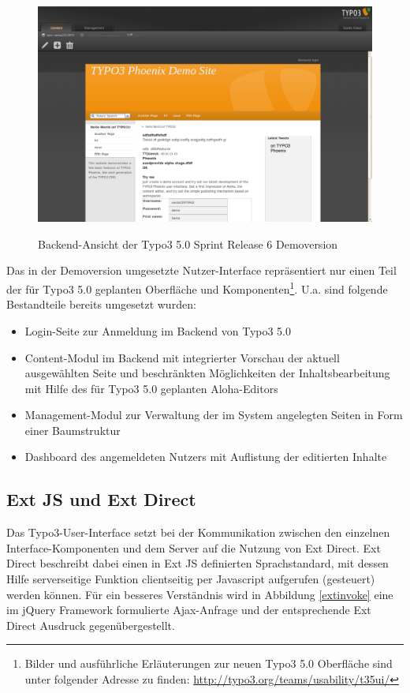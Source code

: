 \begin{figure}[!h]
\begin{center}
\label{fig.typo3backend}
\includegraphics[scale=0.239]{images/typo3/backend.png}
\caption{Backend-Ansicht der Typo3 5.0 Sprint Release 6 Demoversion}
\end{center}
\end{figure}
\newpage
Das in der Demoversion umgesetzte Nutzer-Interface repräsentiert nur einen Teil der für Typo3 5.0 geplanten Oberfläche und Komponenten\footnote{Bilder und ausführliche Erläuterungen zur neuen Typo3 5.0 Oberfläche sind unter folgender Adresse zu finden: \href{http://typo3.org/teams/usability/t35ui/}{http://typo3.org/teams/usability/t35ui/}}. U.a. sind folgende Bestandteile bereits umgesetzt wurden:
\begin{itemize}
\item
Login-Seite zur Anmeldung im Backend von Typo3 5.0
\item
Content-Modul im Backend mit integrierter Vorschau der aktuell ausgewählten Seite und beschränkten Möglichkeiten der Inhaltsbearbeitung mit Hilfe des für Typo3 5.0 geplanten Aloha-Editors
\item
Management-Modul zur Verwaltung der im System angelegten Seiten in Form einer Baumstruktur
\item
Dashboard des angemeldeten Nutzers mit Auflistung der editierten Inhalte
\end{itemize}


\subsection{Ext JS und Ext Direct}

Das Typo3-User-Interface setzt bei der Kommunikation zwischen den einzelnen Interface-Komponenten und dem Server auf die Nutzung von Ext Direct. Ext Direct beschreibt dabei einen in Ext JS definierten Sprachstandard, mit dessen Hilfe serverseitige Funktion clientseitig per Javascript aufgerufen (gesteuert) werden können.
Für ein besseres Verständnis wird in Abbildung \ref{extinvoke} eine im jQuery Framework formulierte Ajax-Anfrage und der entsprechende Ext Direct Ausdruck gegenübergestellt.

